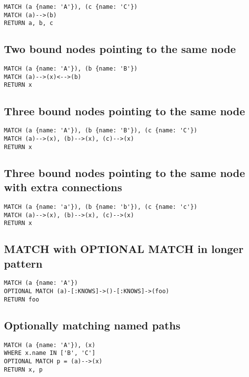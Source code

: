 \begin{lstlisting}
MATCH (a {name: 'A'}), (c {name: 'C'})
MATCH (a)-->(b)
RETURN a, b, c
\end{lstlisting}

\subsection{Two bound nodes pointing to the same node}

\begin{lstlisting}
MATCH (a {name: 'A'}), (b {name: 'B'})
MATCH (a)-->(x)<-->(b)
RETURN x
\end{lstlisting}

\subsection{Three bound nodes pointing to the same node}

\begin{lstlisting}
MATCH (a {name: 'A'}), (b {name: 'B'}), (c {name: 'C'})
MATCH (a)-->(x), (b)-->(x), (c)-->(x)
RETURN x
\end{lstlisting}

\subsection{Three bound nodes pointing to the same node with extra connections}

\begin{lstlisting}
MATCH (a {name: 'a'}), (b {name: 'b'}), (c {name: 'c'})
MATCH (a)-->(x), (b)-->(x), (c)-->(x)
RETURN x
\end{lstlisting}

\subsection{MATCH with OPTIONAL MATCH in longer pattern}

\begin{lstlisting}
MATCH (a {name: 'A'})
OPTIONAL MATCH (a)-[:KNOWS]->()-[:KNOWS]->(foo)
RETURN foo
\end{lstlisting}

\subsection{Optionally matching named paths}

\begin{lstlisting}
MATCH (a {name: 'A'}), (x)
WHERE x.name IN ['B', 'C']
OPTIONAL MATCH p = (a)-->(x)
RETURN x, p
\end{lstlisting}

